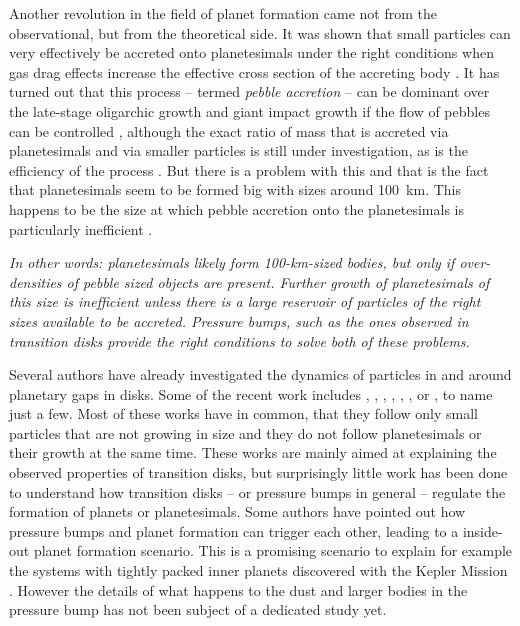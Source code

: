 \documentclass[10pt,fleqn,twoside]{article}
\newenvironment{highlight}{\color{blue}\itshape}{\ignorespacesafterend}
\begin{document}
Another revolution in the field of planet formation came not from the
observational, but from the theoretical side. It was shown that small
particles can very effectively be accreted onto planetesimals under
the right conditions when gas drag effects increase the effective
cross section of the accreting body
\citep{2010A&A...520A..43O,2012A&A...544A..32L}. It has turned out
that this process -- termed \textit{pebble accretion} -- can be
dominant over the late-stage oligarchic growth and giant impact growth
if the flow of pebbles can be controlled \citep{2015Natur.524..322L},
although the exact ratio of mass that is accreted via planetesimals
and via smaller particles is still under investigation, as is the
efficiency of the process
\citep[see][]{2014A&A...572A..72G,2016A&A...586A..66V,2016arXiv160708250O}.
But there is a problem with this and that is the fact that
planetesimals seem to be formed big \citep[][Klahr et al., submitted
to Nature]{2009Icar..204..558M} with sizes around \SI{100}{km}. This
happens to be the size at which pebble accretion onto the
planetesimals is particularly inefficient \citep{2016A&A...586A..66V}.

\begin{highlight}
In other words: planetesimals likely form 100-km-sized bodies, but
only if over-densities of pebble sized objects are present. Further
growth of planetesimals of this size is inefficient unless there is a
large reservoir of particles of the right sizes available to be
accreted. Pressure bumps, such as the ones observed in transition
disks provide the right conditions to solve both of these problems.
\end{highlight}

Several authors have already investigated the dynamics of particles in
and around planetary gaps in disks. Some of the recent work includes
\citet{2004A&A...425L...9P,2006A&A...453.1129P},
\citet{2006MNRAS.373.1619R}, \citet{2009A&A...493.1125L},
\citet{2012ApJ...755....6Z}, \citet{2012A&A...547A..58G},
\citet{2013A&A...553L...3A}, or \citet{2015A&A...584A.110P}, to name
just a few. Most of these works have in common, that they follow only
small particles that are not growing in size and they do not follow
planetesimals or their growth at the same time. These works are mainly
aimed at explaining the observed properties of transition disks, but
surprisingly little work has been done to understand how transition
disks -- or pressure bumps in general -- regulate the formation of
planets or planetesimals. Some authors \citep[e.g.][and following
papers in that series]{2014ApJ...780...53C} have pointed out how
pressure bumps and planet formation can trigger each other, leading to
a inside-out planet formation scenario. This is a promising scenario
to explain for example the systems with tightly packed inner planets
discovered with the Kepler Mission \citep{2012ApJ...761...92F}.
However the details of what happens to the dust and larger bodies in
the pressure bump has not been subject of a dedicated study yet.
\end{document}
